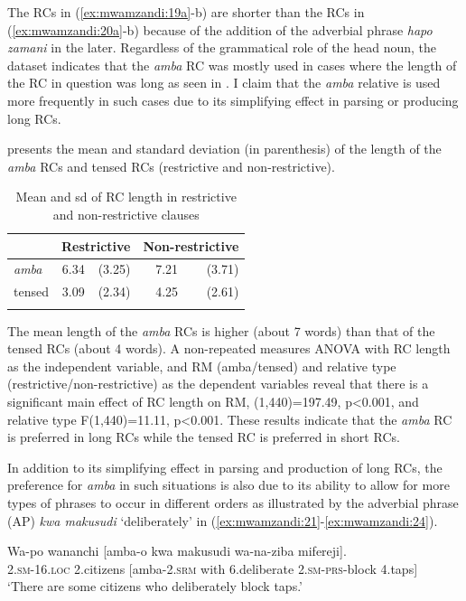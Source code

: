 \documentclass[output=paper,colorlinks,citecolor=brown]{langscibook}
\begin{document}
The RCs in (\ref{ex:mwamzandi:19a}-b) are shorter than the RCs in (\ref{ex:mwamzandi:20a}-b) because of the addition of the adverbial phrase \textit{hapo zamani} in the later. Regardless of the grammatical role of the head noun, the dataset indicates that the \textit{amba} RC was mostly used in cases where the length of the RC in question was long as seen in . I claim that the \textit{amba} relative is used more frequently in such cases due to its simplifying effect in parsing or producing long RCs.

 presents the mean and standard deviation (in parenthesis) of the length of the \textit{amba} RCs and tensed RCs (restrictive and non-restrictive).

\begin{table}
    \begin{tabularx}{.55\textwidth}{Xrrrr} 
    \lsptoprule
    & \multicolumn{2}{l}{Restrictive} & \multicolumn{2}{l}{Non-restrictive}\\
    \midrule
    \textit{amba} & 6.34 & (3.25) & 7.21 & (3.71)\\
    tensed & 3.09 & (2.34) & 4.25 & (2.61)\\
    \lspbottomrule
    \end{tabularx}
    \caption{Mean and sd of RC length in restrictive and non-restrictive clauses}
    \label{tab:mwamzandi:1}
\end{table}

The mean length of the \textit{amba} RCs is higher (about 7 words) than that of the tensed RCs (about 4 words). A non-repeated measures ANOVA with RC length as the independent variable, and RM (amba/tensed) and relative type (restrictive/non-restrictive) as the dependent variables reveal that there is a significant main effect of RC length on RM, (1,440)=197.49, p<0.001, and relative type F(1,440)=11.11, p<0.001. These results indicate that the \textit{amba} RC is preferred in long RCs while the tensed RC is preferred in short RCs.

In addition to its simplifying effect in parsing and production of long RCs, the preference for \textit{amba} in such situations is also due to its ability to allow for more types of phrases to occur in different orders as illustrated by the adverbial phrase (AP) \textit{kwa makusudi} ‘deliberately’ in (\ref{ex:mwamzandi:21}-\ref{ex:mwamzandi:24}).

\ea%
    \label{ex:mwamzandi:21}
    \gll    Wa-po wananchi [amba-o kwa makusudi wa-na-ziba mifereji].\\
            \textsc{2.sm-16.loc} 2.citizens [amba\textsc{-2.srm} with 6.deliberate  \textsc{2.sm-prs-}block 4.taps]\\
    \glt    ‘There are some citizens who deliberately block taps.’
\z
\end{document}
